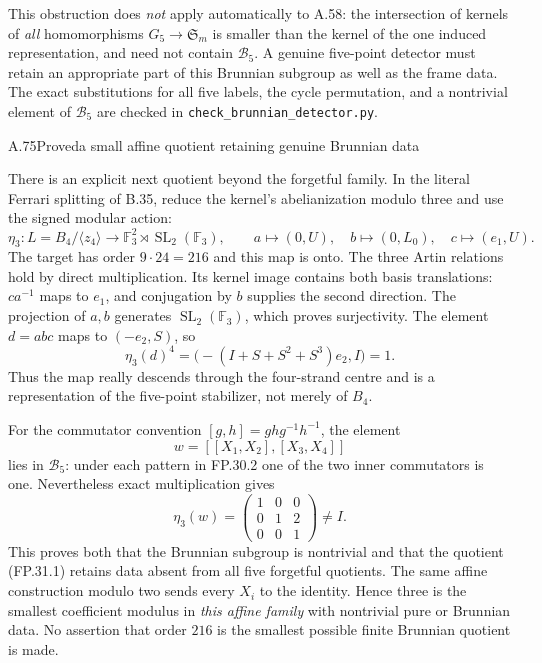 This obstruction does \emph{not} apply automatically to A.58:
the intersection of kernels of \emph{all} homomorphisms
$G_5\to\mathfrak S_m$ is smaller than the kernel of the one induced
representation, and need not contain $\mathcal B_5$. A genuine
five-point detector must retain an appropriate part of this Brunnian
subgroup as well as the frame data. The exact substitutions for all
five labels, the cycle permutation, and a nontrivial element of
$\mathcal B_5$ are checked in
\texttt{check\_brunnian\_detector.py}.

\begin{statement}{A.75}{Proved}{a small affine quotient retaining genuine Brunnian data}
\end{statement}
There is an explicit next quotient beyond the forgetful family.
In the literal Ferrari splitting of B.35, reduce the kernel's
abelianization modulo three and use the signed modular action:
\[
 \eta_3:L=B_4/\langle z_4\rangle
       \longrightarrow\mathbb F_3^2\rtimes\operatorname{SL}_2(\mathbb F_3),
 \qquad
 a\longmapsto(0,U),\quad b\longmapsto(0,L_0),\quad
 c\longmapsto(e_1,U).
 \tag{FP.31.1}
\]
The target has order $9\cdot24=216$ and this map is onto.
The three Artin relations hold by direct multiplication.
Its kernel image contains both basis translations: $ca^{-1}$ maps
to $e_1$, and conjugation by $b$ supplies the second direction.
The projection of $a,b$ generates $\operatorname{SL}_2(\mathbb F_3)$,
which proves surjectivity.
The element $d=abc$ maps to $(-e_2,S)$, so
\[
 \eta_3(d)^4=\bigl(-(I+S+S^2+S^3)e_2,I\bigr)=1.
\]
Thus the map really descends through the four-strand centre and is
a representation of the five-point stabilizer, not merely of $B_4$.

For the commutator convention $[g,h]=ghg^{-1}h^{-1}$, the element
\[
 w=[[X_1,X_2],[X_3,X_4]]
\]
lies in $\mathcal B_5$: under each pattern in FP.30.2 one of the two
inner commutators is one. Nevertheless exact multiplication gives
\[
 \eta_3(w)=
 \begin{pmatrix}1&0&0\\0&1&2\\0&0&1\end{pmatrix}\ne I.
 \tag{FP.31.2}
\]
This proves both that the Brunnian subgroup is nontrivial and that
the quotient (FP.31.1) retains data absent from all five forgetful
quotients. The same affine construction modulo two sends every
$X_i$ to the identity. Hence three is the smallest coefficient
modulus in \emph{this affine family} with nontrivial pure or Brunnian
data. No assertion that order $216$ is the smallest possible finite
Brunnian quotient is made.


